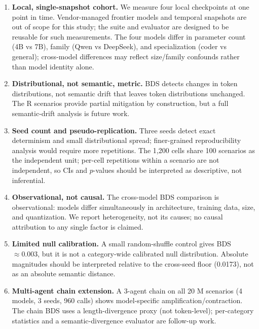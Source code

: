 \documentclass[11pt]{article}
\begin{document}
\begin{enumerate}[nosep]
  \item \textbf{Local, single-snapshot cohort.} We measure four local
        checkpoints at one point in time. Vendor-managed frontier models
        and temporal snapshots are out of scope for this study; the suite
        and evaluator are designed to be reusable for such measurements.
        The four models differ in parameter count (4B vs 7B), family
        (Qwen vs DeepSeek), and specialization (coder vs general);
        cross-model differences may reflect size/family confounds rather
        than model identity alone.
  \item \textbf{Distributional, not semantic, metric.} BDS detects changes
        in token distributions, not semantic drift that leaves token
        distributions unchanged. The \textsc{R} scenarios provide partial
        mitigation by construction, but a full semantic-drift analysis is
        future work.
  \item \textbf{Seed count and pseudo-replication.} Three seeds detect
        exact determinism and small distributional spread; finer-grained
        reproducibility analysis would require more repetitions. The
        1,200 cells share 100 scenarios as the independent unit; per-cell
        repetitions within a scenario are not independent, so CIs and
        $p$-values should be interpreted as descriptive, not inferential.
  \item \textbf{Observational, not causal.} The cross-model BDS
        comparison is observational: models differ simultaneously in
        architecture, training data, size, and quantization. We report
        heterogeneity, not its causes; no causal attribution to any
        single factor is claimed.
  \item \textbf{Limited null calibration.} A small random-shuffle control
        gives BDS $\approx 0.003$, but it is not a category-wide calibrated
        null distribution. Absolute magnitudes should be interpreted
        relative to the cross-seed floor (0.0173), not as an absolute
        semantic distance.
  \item \textbf{Multi-agent chain extension.} A 3-agent chain on all 20
        \textsc{M} scenarios (4 models, 3 seeds, 960 calls) shows
        model-specific amplification/contraction. The chain BDS uses a
        length-divergence proxy (not token-level); per-category
        statistics and a semantic-divergence evaluator are follow-up work.
\end{enumerate}
\end{document}
